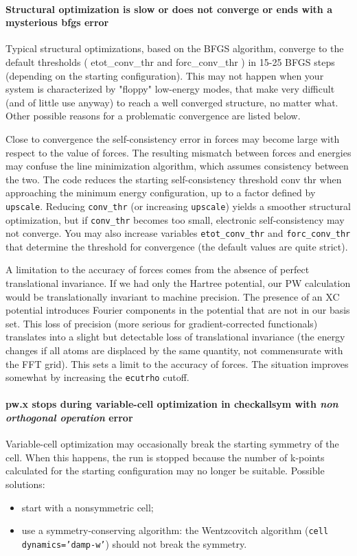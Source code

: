 \documentclass[12pt,a4paper]{article}
\begin{document}
\paragraph{Structural optimization is slow or does not converge or ends 
with a mysterious bfgs error}
Typical structural optimizations, based on the BFGS algorithm,
converge to the default thresholds ( etot\_conv\_thr and
forc\_conv\_thr ) in 15-25 BFGS steps (depending on the 
starting configuration). This may not happen when your
system is characterized by "floppy" low-energy modes, that make very
difficult (and of little use anyway) to reach a well converged structure, no
matter what. Other possible reasons for a problematic convergence are listed
below.
    
Close to convergence the self-consistency error in forces may become large
with respect to the value of forces. The resulting mismatch between forces
and energies may confuse the line minimization algorithm, which assumes
consistency between the two. The code reduces the starting self-consistency
threshold conv thr when approaching the minimum energy configuration, up
to a factor defined by \texttt{upscale}. Reducing \texttt{conv\_thr}
(or increasing \texttt{upscale})
yields a smoother structural optimization, but if \texttt{conv\_thr} becomes too small,
electronic self-consistency may not converge. You may also increase variables
\texttt{etot\_conv\_thr} and \texttt{forc\_conv\_thr} that determine the threshold for
convergence (the default values are quite strict).
    
A limitation to the accuracy of forces comes from the absence of perfect
translational invariance. If we had only the Hartree potential, our PW
calculation would be translationally invariant to machine
precision. The presence of an XC potential
introduces Fourier components in the potential that are not in our
basis set. This loss of precision (more serious for gradient-corrected
functionals) translates into a slight but detectable loss 
of translational invariance (the energy changes if all atoms are displaced by
the same quantity, not commensurate with the FFT grid). This sets a limit
to the accuracy of forces. The situation improves somewhat by increasing
the \texttt{ecutrho} cutoff.

\paragraph{pw.x stops during variable-cell optimization in
  checkallsym with {\em non orthogonal operation} error} 
Variable-cell optimization may occasionally break the starting
symmetry of the cell. When this happens, the run is stopped because
the number of k-points calculated for the starting configuration may
no longer be suitable. Possible solutions: 
\begin{itemize}
\item start with a nonsymmetric cell;
\item use a symmetry-conserving algorithm: the Wentzcovitch algorithm
  (\texttt{cell dynamics='damp-w'}) should not break the symmetry. 
\end{itemize}
\end{document}
